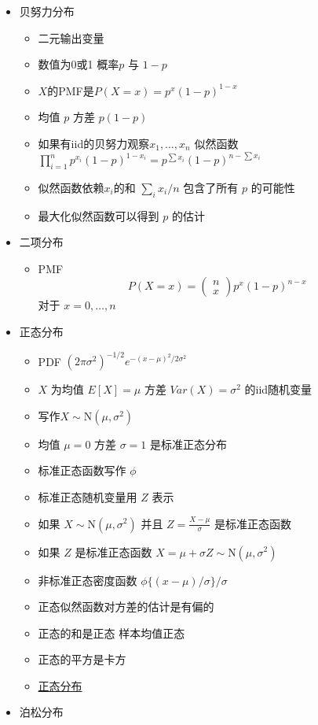 \documentclass[
]{book}
\providecommand{\tightlist}{%
  \setlength{\itemsep}{0pt}\setlength{\parskip}{0pt}}
\begin{document}
\begin{itemize}
\tightlist
\item
  贝努力分布

  \begin{itemize}
  \tightlist
  \item
    二元输出变量
  \item
    数值为0或1 概率\(p\) 与 \(1-p\)
  \item
    \(X\)的PMF是\(P(X = x) = p^x (1 - p)^{1 - x}\)
  \item
    均值 \(p\) 方差 \(p(1 - p)\)
  \item
    如果有iid的贝努力观察\(x_1,\ldots, x_n\) 似然函数 \(\prod_{i=1}^n p^{x_i} (1 - p)^{1 - x_i} = p^{\sum x_i} (1 - p)^{n - \sum x_i}\)
  \item
    似然函数依赖\(x_i\)的和 \(\sum_i x_i / n\) 包含了所有 \(p\) 的可能性
  \item
    最大化似然函数可以得到 \(p\) 的估计
  \end{itemize}
\item
  二项分布

  \begin{itemize}
  \tightlist
  \item
    PMF
    \[
    P(X = x) = 
    \left(
    \begin{array}{c}
    n \\ x
    \end{array}
    \right)
    p^x(1 - p)^{n-x}
    \]
    对于 \(x=0,\ldots,n\)
  \end{itemize}
\item
  正态分布

  \begin{itemize}
  \tightlist
  \item
    PDF \((2\pi \sigma^2)^{-1/2}e^{-(x - \mu)^2/2\sigma^2}\)
  \item
    \(X\) 为均值 \(E[X] = \mu\) 方差 \(Var(X) = \sigma^2\) 的iid随机变量
  \item
    写作\(X\sim \mbox{N}(\mu, \sigma^2)\)
  \item
    均值 \(\mu = 0\) 方差 \(\sigma = 1\) 是标准正态分布
  \item
    标准正态函数写作 \(\phi\)
  \item
    标准正态随机变量用 \(Z\) 表示
  \item
    如果 \(X \sim \mbox{N}(\mu,\sigma^2)\) 并且 \(Z = \frac{X -\mu}{\sigma}\) 是标准正态函数
  \item
    如果 \(Z\) 是标准正态函数 \(X = \mu + \sigma Z \sim \mbox{N}(\mu, \sigma^2)\)
  \item
    非标准正态密度函数 \(\phi\{(x - \mu) / \sigma\}/\sigma\)
  \item
    正态似然函数对方差的估计是有偏的
  \item
    正态的和是正态 样本均值正态
  \item
    正态的平方是卡方
  \item
    \href{http://songshuhui.net/archives/76501}{正态分布}
  \end{itemize}
\item
  泊松分布


\end{itemize}
\end{document}
